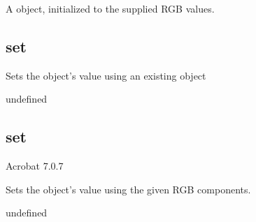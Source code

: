 \documentclass[letterpaper,12pt,english,openany,oneside]{sphinxmanual}
\begin{document}
\label{\detokenize{JS_3D_API:section-14}}\label{\detokenize{JS_3D_API:returns-12}}

A  object, initialized to the supplied RGB values.


\subsection{set}
\label{\detokenize{JS_3D_API:set}}
Sets the  object’s value using an existing  object

\label{\detokenize{JS_3D_API:syntax-13}}

\begin{sphinxVerbatim}[commandchars=\\\{\}]
\end{sphinxVerbatim}
\label{\detokenize{JS_3D_API:parameters-7}}

\label{\detokenize{JS_3D_API:section-15}}\label{\detokenize{JS_3D_API:returns-13}}

undefined


\subsection{set}
\label{\detokenize{JS_3D_API:set-1}}\label{\detokenize{JS_3D_API:id4}}
Acrobat 7.0.7

Sets the  object’s value using the given RGB components.

\label{\detokenize{JS_3D_API:syntax-14}}

\begin{sphinxVerbatim}[commandchars=\\\{\}]
  
\end{sphinxVerbatim}
\label{\detokenize{JS_3D_API:parameters-8}}

\label{\detokenize{JS_3D_API:section-16}}\label{\detokenize{JS_3D_API:returns-14}}

undefined
\end{document}
